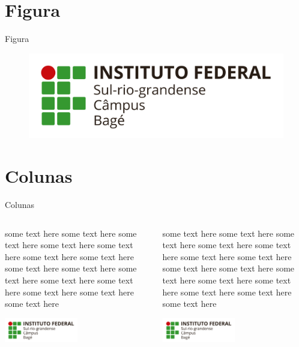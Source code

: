 \documentclass{beamer}
\begin{document}
\section{Figura}
\begin{frame}{Figura}
	\begin{figure}[!htb]
		\centering
		\includegraphics[scale=.1]{ifsul.png}
	\end{figure}
\end{frame}

\section{Colunas}
\begin{frame}{Colunas}
\begin{columns}
	\begin{column}{0.5\textwidth}
		some text here some text here some text here some text here some text here
		some text here some text here some text here some text here some text here
		some text here some text here some text here some text here some text here
		\begin{center}
			\includegraphics[width=0.5\textwidth]{ifsul.png}
		\end{center}
	\end{column}
	\begin{column}{0.5\textwidth}  %
		some text here some text here some text here some text here some text here
		some text here some text here some text here some text here some text here
		some text here some text here some text here some text here some text here
		\begin{center}
			\includegraphics[width=0.5\textwidth]{ifsul.png}
		\end{center}
	\end{column}
\end{columns}
\end{frame}
\end{document}
